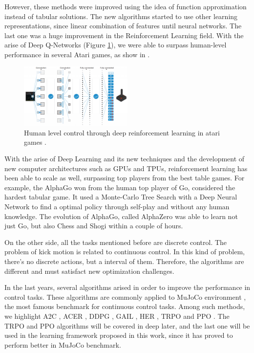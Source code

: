However, these methods were improved using the idea of function approximation instead of tabular solutions. The new algorithms started to use other learning representations, since linear combination of features until neural networks. The last one was a huge improvement in the Reinforcement Learning field. With the arise of Deep Q-Networks (Figure \ref{dqn}), we were able to surpass human-level performance in several Atari games, as show in \cite{mnih2015humanlevel}.

\begin{figure}[ht!]
	\centering
	\includegraphics[width=0.5\textwidth]{Cap2/dqn.eps}
	\caption{Human level control through deep reinforcement learning in atari games
		\cite{mnih2015humanlevel}.}
	\label{dqn}
\end{figure}

With the arise of Deep Learning and its new techniques and the development of new computer architectures such as GPUs and TPUs, reinforcement learning has been able to scale as well, surpassing top players from the best table games. For example, the AlphaGo \cite{alphago} won from the human top player of Go, considered the hardest tabular game. It used a Monte-Carlo Tree Search with a Deep Neural Network to find a optimal policy through self-play and without any human knowledge. The evolution of AlphaGo, called AlphaZero \cite{alphazero} was able to learn not just Go, but also Chess and Shogi within a couple of hours.

On the other side, all the tasks mentioned before are discrete control. The problem of kick motion is related to continuous control. In this kind of problem, there's no discrete actions, but a interval of them. Therefore, the algorithms are different and must satisfact new optimization challenges.

In the last years, several algorithms arised in order to improve the performance in control tasks. These algorithms are commonly applied to MuJoCo environment \cite{mujoco}, the most famous benchmark for continuous control tasks. Among such methods, we highlight A2C \cite{a2c}, ACER \cite{acer}, DDPG \cite{ddpg}, GAIL \cite{gail}, HER \cite{her}, TRPO \cite{trpo} and PPO \cite{PPO}. The TRPO and PPO algorithms will be covered in deep later, and the last one will be used in the learning framework proposed in this work, since it has proved to perform better in MuJoCo benchmark.

